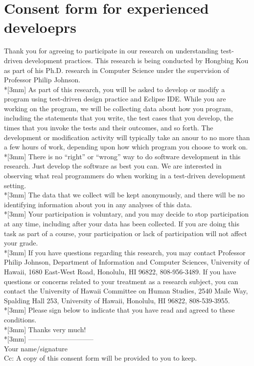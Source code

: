\chapter{Consent form for experienced develoeprs}
\label{app:consent2}
\noindent Thank you for agreeing to participate in our research on
understanding test-driven development practices. This research is being
conducted by Hongbing Kou as part of his Ph.D. research in Computer Science
under the supervision of Professor Philip Johnson.\\*[3mm]
As part of this research, you will be asked to develop or modify a program
using test-driven design practice and Eclipse IDE. While you are working on
the program, we will be collecting data about how you program, including
the statements that you write, the test cases that you develop, the times
that you invoke the tests and their outcomes, and so forth. The development
or modification activity will typically take an anour to no more than a few
hours of work, depending upon how which program you choose to work on.\\*[3mm]
There is no ``right'' or ``wrong'' way to do software development in this
research. Just develop the software as best you can. We are interested in
observing what real programmers do when working in a test-driven
development setting.\\*[3mm]
The data that we collect will be kept anonymously, and there will be no
identifying information about you in any analyses of this data.\\*[3mm]
Your participation is voluntary, and you may decide to stop participation
at any time, including after your data has been collected.  If you are
doing this task as part of a course, your participation or lack of
participation will not affect your grade.\\*[3mm]
If you have questions regarding this research, you may contact Professor
Philip Johnson, Department of Information and Computer Sciences, University
of Hawaii, 1680 East-West Road, Honolulu, HI 96822, 808-956-3489.  If you
have questions or concerns related to your treatment as a research subject,
you can contact the University of Hawaii Committee on Human Studies, 2540
Maile Way, Spalding Hall 253, University of Hawaii, Honolulu, HI 96822,
808-539-3955. \\*[3mm]
Please sign below to indicate that you have read and agreed to these
conditions.\\*[3mm]
Thanks very much! \\*[3mm]
----------------------------- \\
Your name/signature\\
Cc: A copy of this consent form will be provided to you to keep.

